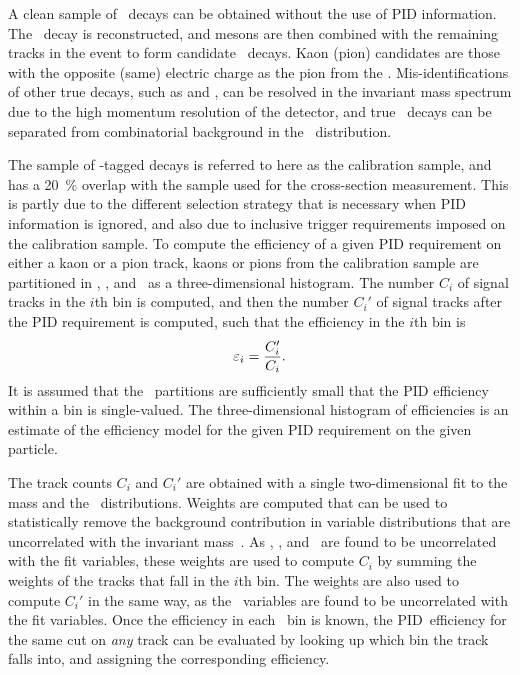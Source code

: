 A clean sample of \DzToKpi\ decays can be obtained without the use of \ac{PID}
information.
The \DzToKpi\ decay is reconstructed, and \PDzero mesons are then combined with
the remaining tracks in the event to form candidate \DstToDzpi\ decays.
Kaon (pion) candidates are those with the opposite (same) electric charge as
the pion from the \PDstarp.
Mis-identifications of other true \PDzero decays, such as
\decay{\PDzero}{\Ppiplus\Ppiminus} and \decay{\PDzero}{\PKplus\PKminus}, can be
resolved in the \PDzero invariant mass spectrum due to the high momentum
resolution of the detector, and true \PDstarp\ decays can be separated from
combinatorial background in the \deltam\ distribution.

The sample of \PDstarp-tagged \PDzero decays is referred to here as the
calibration sample, and has a \SI{20}{\percent} overlap with the sample used
for the cross-section measurement.
This is partly due to the different selection strategy that is necessary when
\ac{PID} information is ignored, and also due to inclusive trigger requirements
imposed on the calibration sample.
To compute the efficiency of a given \ac{PID} requirement on either a kaon or a
pion track, kaons or pions from the calibration sample are partitioned in
\ptot, \Eta, and \nspd\ as a three-dimensional histogram.
The number $C_{i}$ of signal tracks in the $i$th bin is computed, and then the
number $C_{i}'$  of signal tracks after the \ac{PID} requirement is computed,
such that the efficiency in the $i$th bin is
\begin{equation}
  \varepsilon_{i} = \frac{C_{i}'}{C_{i}}.
\end{equation}
It is assumed that the \ptotetanspd\ partitions are sufficiently small that the
\ac{PID} efficiency within a bin is single-valued.
The three-dimensional histogram of efficiencies is an estimate of the
efficiency model for the given \ac{PID} requirement on the given particle.

The track counts $C_{i}$ and $C_{i}'$ are obtained with a single
two-dimensional fit to the \PDzero mass and the \deltam\ distributions.
Weights are computed that can be used to statistically remove the background
contribution in variable distributions that are uncorrelated with the invariant
mass~\cite{Pivk:2004ty}.
As \ptot, \Eta, and \nspd\ are found to be uncorrelated with the fit variables,
these weights are used to compute $C_{i}$ by summing the weights of the tracks
that fall in the $i$th bin.
The weights are also used to compute $C_{i}'$ in the same way, as the \dll\
variables are found to be uncorrelated with the fit variables.
Once the efficiency in each \ptotetanspd\ bin is known, the \ac{PID}\
efficiency for the same cut on \emph{any} track can be evaluated by looking up
which bin the track falls into, and assigning the corresponding efficiency.

